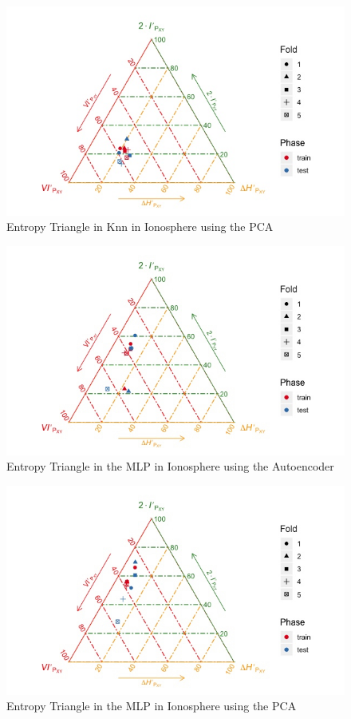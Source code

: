 \documentclass[12pt]{report}
\begin{document}
\begin{figure}[H]
	\centering
	\includegraphics[width=1\linewidth]{Figuras_tfg/ET_knn_Ionosphere_pca}
	\caption{Entropy Triangle in Knn in Ionosphere using the PCA}
	\label{fig:figure_Knn_Ionosphere_ET_PCA}
\end{figure}

\begin{figure}[H]
	\centering
	\includegraphics[width=1\linewidth]{Figuras_tfg/ET_mlp_Ionosphere_auto}
	\caption{Entropy Triangle in the MLP in Ionosphere using the Autoencoder}
	\label{fig:figure_MLP_Ionosphere_ET_Auto}
\end{figure}

\begin{figure}[H]
	\centering
	\includegraphics[width=1\linewidth]{Figuras_tfg/ET_mlp_Ionosphere_pca}
	\caption{Entropy Triangle in the MLP in Ionosphere using the PCA}
	\label{fig:figure_MLP_Ionosphere_ET_PCA}
\end{figure}
\end{document}
